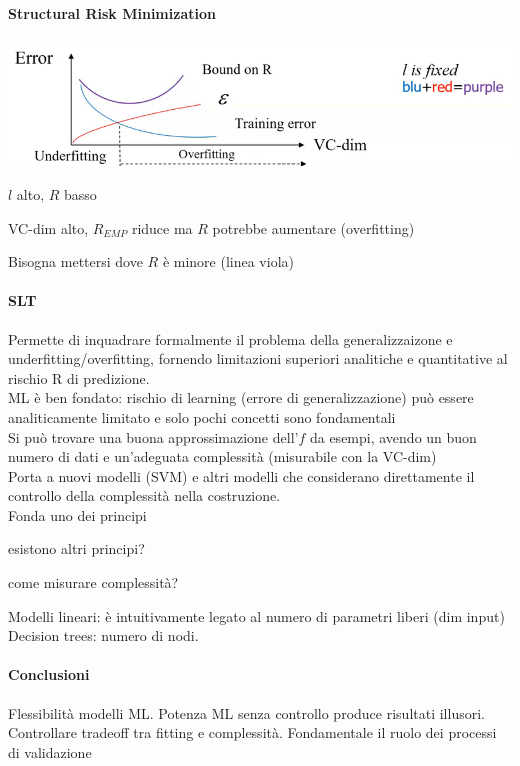 \documentclass[10pt]{book}
\begin{document}
\paragraph{Structural Risk Minimization}
\begin{center}
\includegraphics[scale=0.7]{vc-dim.png}
\end{center}
\begin{list}{}{\textbf{Intuizione}}
	\item $l$ alto, $R$ basso
	\item VC-dim alto, $R_{EMP}$ riduce ma $R$ potrebbe aumentare (overfitting)
\end{list}
Bisogna mettersi dove $R$ è minore (linea viola)
\paragraph{SLT} Permette di inquadrare formalmente il problema della generalizzaizone e underfitting/overfitting, fornendo limitazioni superiori analitiche e quantitative al rischio R di predizione.\\
ML è ben fondato: rischio di learning (errore di generalizzazione) può essere analiticamente limitato e solo pochi concetti sono fondamentali\\
Si può trovare una buona approssimazione dell'$f$ da esempi, avendo un buon numero di dati e un'adeguata complessità (misurabile con la VC-dim)\\
Porta a nuovi modelli (SVM) e altri modelli che considerano direttamente il controllo della complessità nella costruzione.\\
Fonda uno dei principi 
\begin{list}{}{}
	\item esistono altri principi?
	\item come misurare complessità?
\end{list}
Modelli lineari:  è intuitivamente legato al numero di parametri liberi (dim input)\\
Decision trees: numero di nodi.
\paragraph{Conclusioni} Flessibilità modelli ML. Potenza ML senza controllo produce risultati illusori. Controllare tradeoff tra fitting e complessità. Fondamentale il ruolo dei processi di validazione
\end{document}
